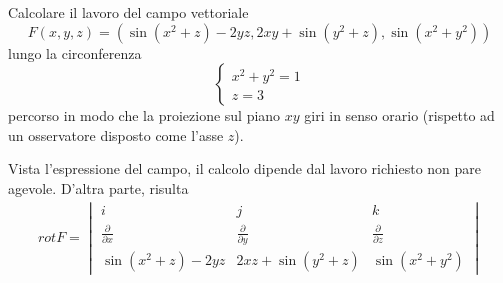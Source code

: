 \clearpage
\begin{esercizio}
  Calcolare il lavoro del campo vettoriale
  \begin{equation*}
    F(x,y,z)=(\sin(x^2+z)- 2yz, 2xy+\sin(y^2+z),\sin(x^2+y^2))
  \end{equation*}
  lungo la circonferenza
  \begin{equation*}
    \begin{cases}
      x^2+y^2=1\\
        z=3
    \end{cases}
  \end{equation*}
  percorso in modo che la proiezione sul piano $xy$ giri in senso orario (rispetto ad un osservatore disposto come l'asse $z$).\\
\end{esercizio}
\begin{svol}
  Vista l'espressione del campo, il calcolo dipende dal lavoro richiesto non pare agevole. D'altra parte, risulta
  \begin{equation*}
    \begin{matrix}
	rot F= \begin{vmatrix}
            i & j & k\\
            \frac{\partial}{\partial x} & \frac{\partial}{\partial y} &  \frac{\partial}{\partial z}\\
            \sin(x^2+z)-2yz & 2xz+\sin(y^2+z) & \sin (x^2+y^2)
        \end{vmatrix}
    \end{matrix}
  \end{equation*}
    
\end{svol}

  
